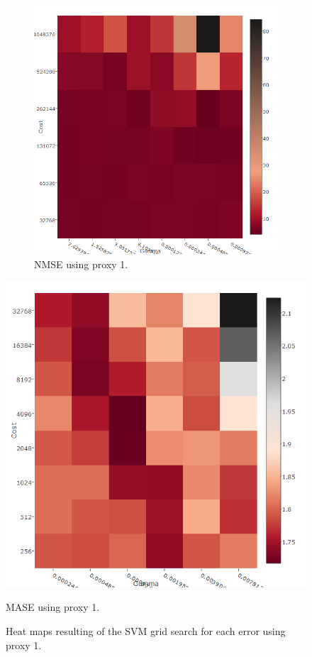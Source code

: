 \begin{center}
\begin{figure}[!h]
{\begin{subfigure}{.6\linewidth}
  \includegraphics[width=\linewidth, height = 0.33\textheight]{img/10yNMSEsigma.png}
  \caption{NMSE using proxy 1.}
  \label{fig:heat2a}
\end{subfigure}}
  \centering
  \includegraphics[width=0.65\linewidth, height = 0.35\textheight]{img/10yMASEsigma.png}
  \caption{MASE using proxy 1.}
  \label{fig:heat3a}
\caption{Heat maps resulting of the SVM grid search for each error using proxy 1.}
\label{fig:heat10yp1}
\end{figure}\end{center}
